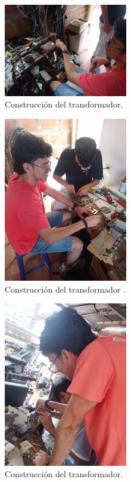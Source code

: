 \begin{figure}[ht!]
    \centering
    \includegraphics[width=0.48\textwidth]{fot/TA2.jpeg}
    \caption{Construcción del transformador.}
    \label{fig:TA2}
\end{figure}

\begin{figure}[ht!]
    \centering
    \includegraphics[width=0.48\textwidth]{fot/TA3.jpeg}
    \caption{Construcción del transformador .}
    \label{fig:TA3}
\end{figure}

\begin{figure}[ht!]
    \centering
    \includegraphics[width=0.48\textwidth]{fot/TA4.jpeg}
    \caption{Construcción del transformador.}
    \label{fig:TA4}
\end{figure}

